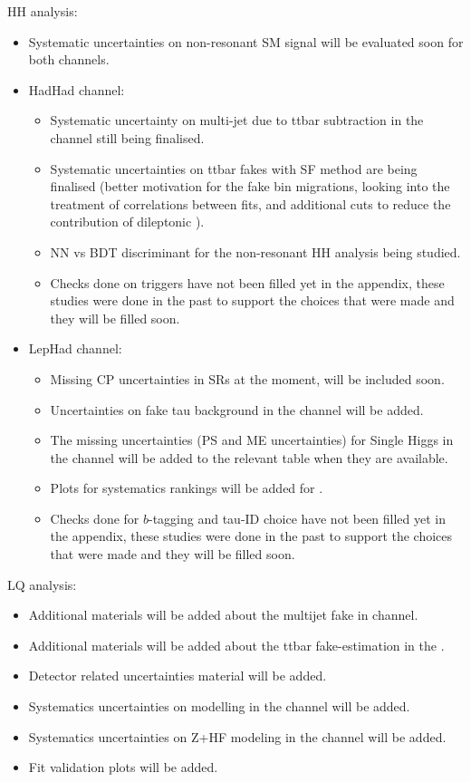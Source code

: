 HH analysis:

\begin{itemize}
\item Systematic uncertainties on non-resonant SM signal will be evaluated soon for both channels.
\item HadHad channel:
\begin{itemize}
\item Systematic uncertainty on multi-jet due to ttbar subtraction in the \hadhad channel still being finalised.
\item Systematic uncertainties on ttbar fakes with SF method are being finalised (better motivation for the fake bin migrations, looking into the treatment of correlations between fits, and additional cuts to reduce the contribution of dileptonic \ttbar).
\item NN vs BDT discriminant for the non-resonant HH \hadhad analysis being studied.
\item Checks done on triggers have not been filled yet in the appendix, these studies were done in the past to support the choices that were made and they will be filled soon.
\end{itemize}
\item LepHad channel:
\begin{itemize}
\item Missing CP uncertainties in \lephad SRs at the moment, will be included soon.
\item Uncertainties on fake tau background in the \lephad channel will be added.
\item The missing uncertainties (PS and ME uncertainties) for Single Higgs in the \lephad channel will be added to the relevant table when they are available.
\item Plots for systematics rankings will be added for \lephad.
\item Checks done for $b$-tagging and tau-ID choice have not been filled yet in the appendix, these studies were done in the past to support the choices that were made and they will be filled soon.
\end{itemize}
\end{itemize}


LQ analysis:

\begin{itemize}
  \item Additional materials will be added about the multijet fake in \lephad channel.
  \item Additional materials will be added about the ttbar fake-\tauhad estimation in the \hadhad.
  \item Detector related uncertainties material will be added.
  \item Systematics uncertainties on \ttbar modelling in the \hadhad channel will be added.
  \item Systematics uncertainties on Z+HF modeling in the \lephad channel will be added.
  \item Fit validation plots will be added.
\end{itemize}
